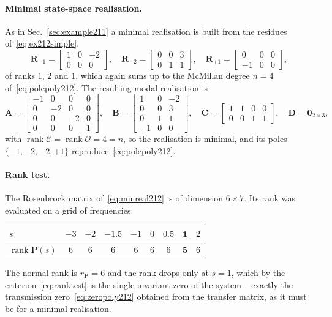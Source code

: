 \paragraph{Minimal state-space realisation.} As in Sec.~\ref{sec:example211} a minimal
realisation is built from the residues of~\eqref{eq:ex212simple},
\begin{equation}
    \mathbf{R}_{-1}=\begin{bmatrix}1&0&-2\\0&0&0\end{bmatrix},\quad
    \mathbf{R}_{-2}=\begin{bmatrix}0&0&3\\0&1&1\end{bmatrix},\quad
    \mathbf{R}_{+1}=\begin{bmatrix}0&0&0\\-1&0&0\end{bmatrix},
    \label{eq:residues212}
\end{equation}
of ranks $1$, $2$ and $1$, which again sums up to the McMillan degree $n=4$
of~\eqref{eq:polepoly212}. The resulting modal realisation is
\begin{equation}
    \mathbf{A}=\begin{bmatrix}-1&0&0&0\\0&-2&0&0\\0&0&-2&0\\0&0&0&1\end{bmatrix},\quad
    \mathbf{B}=\begin{bmatrix}1&0&-2\\0&0&3\\0&1&1\\-1&0&0\end{bmatrix},\quad
    \mathbf{C}=\begin{bmatrix}1&1&0&0\\0&0&1&1\end{bmatrix},\quad
    \mathbf{D}=\mathbf{0}_{2\times3},
    \label{eq:minreal212}
\end{equation}
with $\operatorname{rank}\mathcal{C}=\operatorname{rank}\mathcal{O}=4=n$, so the realisation is
minimal, and its poles $\{-1,-2,-2,+1\}$ reproduce~\eqref{eq:polepoly212}.

\paragraph{Rank test.} The Rosenbrock matrix of~\eqref{eq:minreal212} is of dimension
$6\times7$. Its rank was evaluated on a grid of frequencies:
\begin{center}
\begin{tabular}{l|cccccccc}
    $s$ & $-3$ & $-2$ & $-1.5$ & $-1$ & $0$ & $0.5$ & $\mathbf{1}$ & $2$\\\hline
    $\operatorname{rank}\mathbf{P}(s)$ & 6 & 6 & 6 & 6 & 6 & 6 & $\mathbf{5}$ & 6
\end{tabular}
\end{center}
The normal rank is $r_{\mathbf{P}}=6$ and the rank drops only at $s=1$, which by the
criterion~\eqref{eq:ranktest} is the single invariant zero of the system -- exactly the
transmission zero~\eqref{eq:zeropoly212} obtained from the transfer matrix, as it must be for a
minimal realisation.

